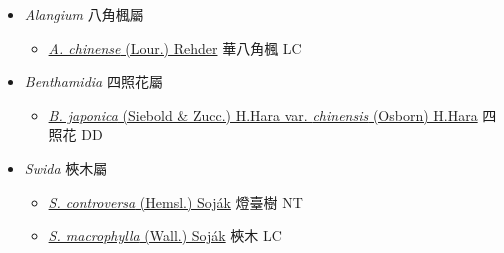 
  \begin{itemize}
 \item[] \textit{Alangium} 八角楓屬
                    
  \begin{itemize}
        \item[] \href{http://www.theplantlist.org/tpl1.1/search?q=Alangium+chinense}{\textit{A. chinense} (Lour.) Rehder}   華八角楓 LC
  \end{itemize}
 \item[] \textit{Benthamidia} 四照花屬
                    
  \begin{itemize}
        \item[] \href{http://www.theplantlist.org/tpl1.1/search?q=Benthamidia+japonica+var.+chinensis}{\textit{B. japonica} (Siebold \& Zucc.) H.Hara var. \textit{chinensis} (Osborn) H.Hara}   四照花 DD
  \end{itemize}
 \item[] \textit{Swida} 梜木屬
                    
  \begin{itemize}
        \item[] \href{http://www.theplantlist.org/tpl1.1/search?q=Swida+controversa}{\textit{S. controversa} (Hemsl.) Soják}   燈臺樹 NT
        \item[] \href{http://www.theplantlist.org/tpl1.1/search?q=Swida+macrophylla}{\textit{S. macrophylla} (Wall.) Soják}   梜木 LC
  \end{itemize}
  \end{itemize}
